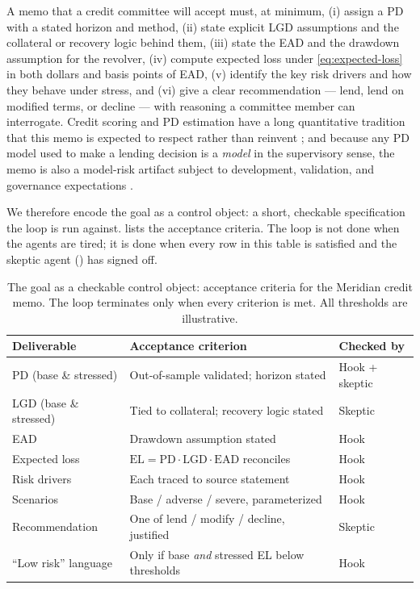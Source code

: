 A memo that a credit committee will accept must, at minimum, (i) assign a PD with a
stated horizon and method, (ii) state explicit LGD assumptions and the collateral
or recovery logic behind them, (iii) state the EAD and the drawdown assumption for
the revolver, (iv) compute expected loss under \cref{eq:expected-loss} in both
dollars and basis points of EAD, (v) identify the key risk drivers and how they
behave under stress, and (vi) give a clear recommendation --- lend, lend on
modified terms, or decline --- with reasoning a committee member can interrogate.
Credit scoring and PD estimation have a long quantitative tradition that this memo
is expected to respect rather than reinvent \citep{thomas2002credit}; and because
any PD model used to make a lending decision is a \emph{model} in the supervisory
sense, the memo is also a model-risk artifact subject to development, validation,
and governance expectations \citep{sr117}.

We therefore encode the goal as a control object: a short, checkable
specification the loop is run against.  lists the acceptance
criteria. The loop is not done when the agents are tired; it is done when every row
in this table is satisfied and the skeptic agent () has
signed off.

\begin{table}[t]
\centering
\caption{The goal as a checkable control object: acceptance criteria for the
Meridian credit memo. The loop terminates only when every criterion is met. All
thresholds are illustrative.}
\label{tab:credit-goal}
\begin{tabularx}{\linewidth}{@{}l X l@{}}
\toprule
Deliverable & Acceptance criterion & Checked by \\
\midrule
PD (base \& stressed) & Out-of-sample validated; horizon stated & Hook + skeptic \\
LGD (base \& stressed) & Tied to collateral; recovery logic stated & Skeptic \\
EAD                    & Drawdown assumption stated                & Hook \\
Expected loss          & $\mathrm{EL}=\mathrm{PD}\cdot\mathrm{LGD}\cdot\mathrm{EAD}$ reconciles & Hook \\
Risk drivers           & Each traced to source statement           & Hook \\
Scenarios              & Base / adverse / severe, parameterized    & Hook \\
Recommendation         & One of lend / modify / decline, justified & Skeptic \\
``Low risk'' language   & Only if base \emph{and} stressed EL below thresholds & Hook \\
\bottomrule
\end{tabularx}
\end{table}

